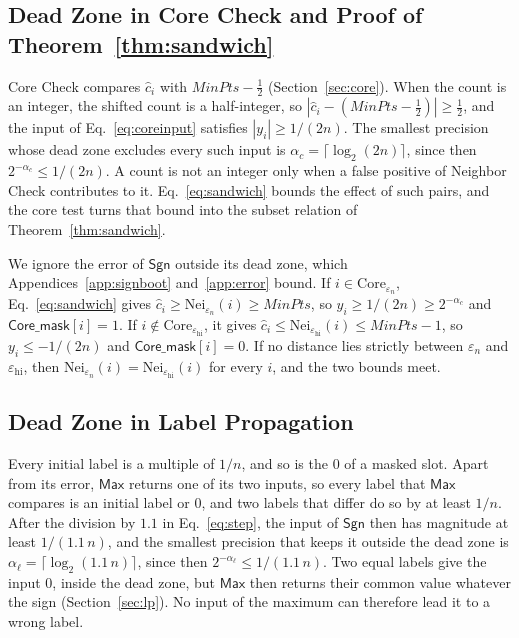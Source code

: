 \subsection{Dead Zone in Core Check and Proof of Theorem~\ref{thm:sandwich}}
\label{app:core}

Core Check compares $\hat{c}_i$ with $\mathit{MinPts} - \tfrac{1}{2}$
(Section~\ref{sec:core}). When the count is an integer, the shifted count
is a half-integer, so
$|\hat{c}_i - (\mathit{MinPts} - \tfrac{1}{2})| \ge \tfrac{1}{2}$, and
the input of Eq.~\eqref{eq:coreinput} satisfies $|y_i| \ge 1/(2n)$. The
smallest precision whose dead zone excludes every such input is
$\alpha_c = \lceil \log_2 (2n) \rceil$, since then
$2^{-\alpha_c} \le 1/(2n)$. A count is not an integer only when a false
positive of Neighbor Check contributes to it. Eq.~\eqref{eq:sandwich}
bounds the effect of such pairs, and the core test turns that bound into
the subset relation of Theorem~\ref{thm:sandwich}.

\begin{IEEEproof}
We ignore the error of $\mathsf{Sgn}$ outside its dead zone, which
Appendices~\ref{app:signboot} and~\ref{app:error} bound.
If $i \in \mathrm{Core}_{\varepsilon_n}$, Eq.~\eqref{eq:sandwich} gives
$\hat{c}_i \ge \mathrm{Nei}_{\varepsilon_n}(i) \ge \mathit{MinPts}$, so
$y_i \ge 1/(2n) \ge 2^{-\alpha_c}$ and $\mathsf{Core\_mask}[i] = 1$. If
$i \notin \mathrm{Core}_{\varepsilon_{\mathrm{hi}}}$, it gives
$\hat{c}_i \le \mathrm{Nei}_{\varepsilon_{\mathrm{hi}}}(i) \le
\mathit{MinPts} - 1$, so $y_i \le -1/(2n)$ and
$\mathsf{Core\_mask}[i] = 0$. If no distance lies strictly between
$\varepsilon_n$ and $\varepsilon_{\mathrm{hi}}$, then
$\mathrm{Nei}_{\varepsilon_n}(i) = \mathrm{Nei}_{\varepsilon_{\mathrm{hi}}}(i)$
for every $i$, and the two bounds meet.
\end{IEEEproof}

\subsection{Dead Zone in Label Propagation}
\label{app:lp}

Every initial label is a multiple of $1/n$, and so is the $0$ of a masked
slot. Apart from its error, $\mathsf{Max}$ returns one of its two inputs,
so every label that $\mathsf{Max}$ compares is an initial label or $0$,
and two labels that differ do so by at least $1/n$. After the division by
$1.1$ in Eq.~\eqref{eq:step}, the input of $\mathsf{Sgn}$ then has
magnitude at least $1/(1.1\,n)$, and the smallest precision that keeps it
outside the dead zone is $\alpha_\ell = \lceil \log_2 (1.1\,n) \rceil$,
since then $2^{-\alpha_\ell} \le 1/(1.1\,n)$. Two equal labels give the
input $0$, inside the dead zone, but $\mathsf{Max}$ then returns their
common value whatever the sign (Section~\ref{sec:lp}). No input of the
maximum can therefore lead it to a wrong label.

